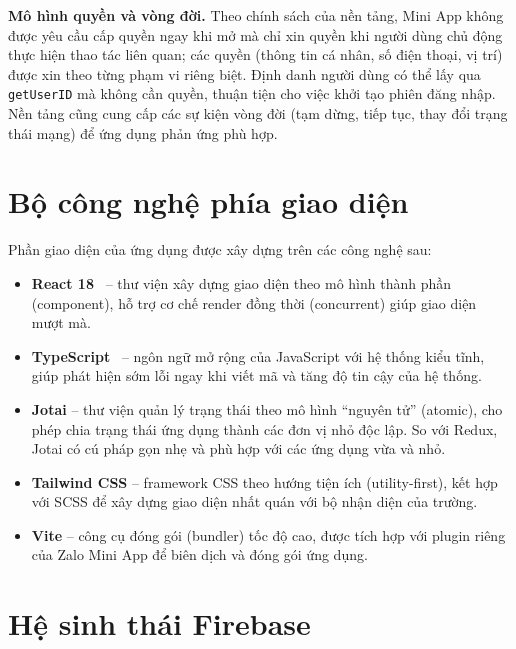 \documentclass[../main.tex]{subfiles}
\begin{document}
\textbf{Mô hình quyền và vòng đời.} Theo chính sách của nền tảng, Mini App không được yêu cầu
cấp quyền ngay khi mở mà chỉ xin quyền khi người dùng chủ động thực hiện thao tác liên quan;
các quyền (thông tin cá nhân, số điện thoại, vị trí) được xin theo từng phạm vi riêng biệt.
Định danh người dùng có thể lấy qua \texttt{getUserID} mà không cần quyền, thuận tiện cho việc
khởi tạo phiên đăng nhập. Nền tảng cũng cung cấp các sự kiện vòng đời (tạm dừng, tiếp tục,
thay đổi trạng thái mạng) để ứng dụng phản ứng phù hợp.

\section{Bộ công nghệ phía giao diện}
\label{sec:frontend}

Phần giao diện của ứng dụng được xây dựng trên các công nghệ sau:

\begin{itemize}[leftmargin=1.5em]
  \item \textbf{React 18}~\cite{reactjs} -- thư viện xây dựng giao diện theo mô hình thành
  phần (component), hỗ trợ cơ chế render đồng thời (concurrent) giúp giao diện mượt mà.

  \item \textbf{TypeScript}~\cite{typescriptlang} -- ngôn ngữ mở rộng của JavaScript với hệ
  thống kiểu tĩnh, giúp phát hiện sớm lỗi ngay khi viết mã và tăng độ tin cậy của hệ thống.

  \item \textbf{Jotai} -- thư viện quản lý trạng thái theo mô hình ``nguyên tử'' (atomic),
  cho phép chia trạng thái ứng dụng thành các đơn vị nhỏ độc lập. So với Redux, Jotai có
  cú pháp gọn nhẹ và phù hợp với các ứng dụng vừa và nhỏ.

  \item \textbf{Tailwind CSS} -- framework CSS theo hướng tiện ích (utility-first), kết
  hợp với SCSS để xây dựng giao diện nhất quán với bộ nhận diện của trường.

  \item \textbf{Vite} -- công cụ đóng gói (bundler) tốc độ cao, được tích hợp với plugin
  riêng của Zalo Mini App để biên dịch và đóng gói ứng dụng.
\end{itemize}

\section{Hệ sinh thái Firebase}
\label{sec:firebase}
\end{document}
